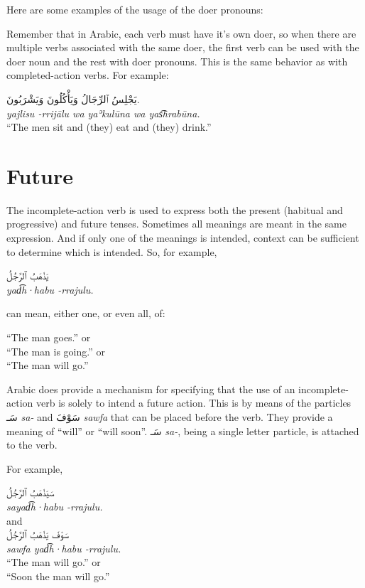 \documentclass[
  10pt,
]{book}
\begin{document}
Here are some examples of the usage of the doer pronouns:

Remember that in Arabic, each verb must have it's own doer, so when there are multiple verbs associated with the same doer, the first verb can be used with the doer noun and the rest with doer pronouns. This is the same behavior as with completed-action verbs. For example:

\foreignlanguage{arabic}{يَجْلِسُ ٱلرِّجَالُ وَيَأْکُلُونَ وَيَشْرَبُونَ.}\\
\emph{yajlisu -rrijālu wa yaʾkulūna wa yas͡hrabūna.}\\
\enquote{The men sit and (they) eat and (they) drink.}

\section{Future}\label{future}

The incomplete-action verb is used to express both the present (habitual and progressive) and future tenses. Sometimes all meanings are meant in the same expression. And if only one of the meanings is intended, context can be sufficient to determine which is intended. So, for example,

\foreignlanguage{arabic}{يَذْهَبُ ٱلرَّجُلُ}\\
\emph{yad͡h·habu -rrajulu.}

can mean, either one, or even all, of:

\enquote{The man goes.} or\\
\enquote{The man is going.} or\\
\enquote{The man will go.}

Arabic does provide a mechanism for specifying that the use of an incomplete-action verb is solely to intend a future action. This is by means of the particles \foreignlanguage{arabic}{سَـ} \emph{sa-} and \foreignlanguage{arabic}{سَوْفَ} \emph{sawfa} that can be placed before the verb. They provide a meaning of \enquote{will} or \enquote{will soon}. \foreignlanguage{arabic}{سَـ} \emph{sa-}, being a single letter particle, is attached to the verb.

For example,

\foreignlanguage{arabic}{سَيَذْهَبُ ٱلرَّجُلُ}\\
\emph{sayad͡h·habu -rrajulu.}\\
and\\
\foreignlanguage{arabic}{سَوْفَ يَذْهَبُ ٱلرَّجُلُ}\\
\emph{sawfa yad͡h·habu -rrajulu.}\\
\enquote{The man will go.} or\\
\enquote{Soon the man will go.}
\end{document}
